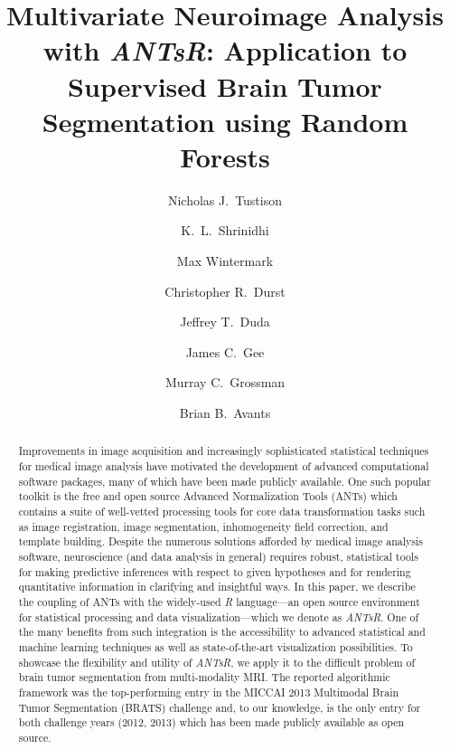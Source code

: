 \documentclass[final,5p,times,twocolumn]{elsarticle}
\begin{document}
\begin{frontmatter}

\title{Multivariate Neuroimage Analysis with \textit{ANTsR}: Application to Supervised Brain Tumor Segmentation using Random Forests}

\author[label1]{Nicholas J.~Tustison
  }
\author[label2]{K.~L.~Shrinidhi}
\author[label1]{Max Wintermark}
\author[label1]{Christopher R.~Durst}
\author[label2]{Jeffrey T.~Duda}
\author[label1]{James C.~Gee}
\author[label3]{Murray C.~Grossman}
\author[label2]{Brian B.~Avants}
\address[label1]{Department of Radiology and Medical Imaging, University of Virginia, Charlottesville, VA}
\address[label2]{Penn Image Computing and Science Laboratory, 
                 Department of Radiology, University of Pennsylvania,
                Philadelphia, PA}
\address[label3]{Department of Neurology, University of Pennsylvania,
                Philadelphia, PA}



\begin{abstract} 
Improvements in image acquisition and increasingly sophisticated statistical techniques 
for medical image analysis have motivated the development of advanced computational software 
packages, many of which
have been made publicly available.  One such popular toolkit is the
free and open source Advanced
Normalization Tools (ANTs) which contains a suite of well-vetted processing tools for
core data transformation tasks such as image registration, image segmentation, 
inhomogeneity field correction, and template building.  Despite the numerous
solutions afforded by medical image analysis software, neuroscience (and data analysis in general) requires
robust, statistical tools for making predictive inferences with respect to given hypotheses
and for rendering quantitative information in clarifying and insightful ways.  
In this paper, we describe the
coupling of ANTs with the widely-used \textit{R} language---an open source environment for 
statistical processing and data visualization---which we denote as \textit{ANTsR}.  One of the
many benefits from such integration is the accessibility to advanced statistical 
and machine learning techniques as well as state-of-the-art visualization possibilities.  
To showcase the flexibility and utility of \textit{ANTsR}, we 
apply it to the difficult problem of brain tumor segmentation from multi-modality
MRI.  The reported algorithmic framework was the top-performing entry in the MICCAI 2013 Multimodal 
Brain Tumor Segmentation (BRATS) challenge and, to our knowledge, is the only entry for
both challenge years (2012, 2013) which has been made publicly available as open source.
\end{abstract}


\end{frontmatter}
\end{document}
